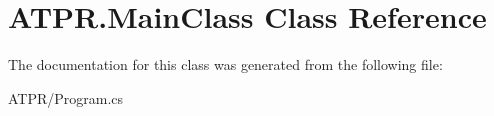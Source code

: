 \hypertarget{class_a_t_p_r_1_1_main_class}{}\section{A\+T\+P\+R.\+Main\+Class Class Reference}
\label{class_a_t_p_r_1_1_main_class}


The documentation for this class was generated from the following file\+:\begin{DoxyCompactItemize}
\item 
A\+T\+P\+R/Program.\+cs\end{DoxyCompactItemize}
